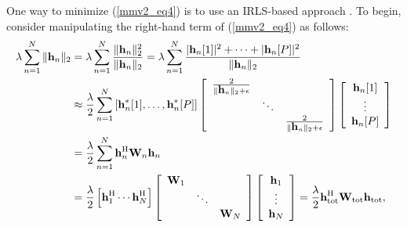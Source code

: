 \documentclass[final]{siamltex}
\newcommand{\la}[1]{\mbox{$\mathbf{#1}$}}  \newcommand{\sst}[1]{\mbox{\scriptsize{#1}}}
\begin{document}
    One way to minimize (\ref{mmv2_eq4}) is to use an IRLS-based
    approach \cite{Kar1970}.  To begin, consider manipulating the
    right-hand term of (\ref{mmv2_eq4}) as follows:
    \begin{equation}\label{irls}
      \begin{split}
        \lambda \sum_{n=1}^{N} \Vert \la{h}_n \Vert_2 &
        = \lambda \sum_{n=1}^{N} \frac{\Vert \la{h}_n \Vert_2^2}{\Vert \la{h}_n \Vert_2}
        = \lambda \sum_{n=1}^{N} \frac{|\la{h}_n[1]|^2 + \cdots + |\la{h}_n[P]|^2}{\Vert \la{h}_n \Vert_2}\\
      & \approx \frac{\lambda}{2} \sum_{n=1}^{N} \left[ \la{h}_n^{\ast}[1], \ldots, \la{h}_n^{\ast}[P]  \right]
              \left[  \begin{array}{ccc}
                 \tfrac{2}{\Vert \la{h}_n \Vert_2 + \epsilon} &        &   \\
                                                 & \ddots &   \\
                                                 &        & \tfrac{2}{\Vert \la{h}_n \Vert_2 + \epsilon} \\
                      \end{array}
              \right]
              \left[ \begin{array}{c}
                       \la{h}_n[1] \\
                       \vdots \\
                       \la{h}_n[P]
                     \end{array}
              \right] \\
         & = \frac{\lambda}{2} \sum_{n=1}^{N} \la{h}_n^{\sst{H}} \la{W}_n \la{h}_n \\
         & = \frac{\lambda}{2} \left[ \la{h}_1^{\sst{H}} \cdots \la{h}_N^{\sst{H}} \right]
                         \left[ \begin{array}{ccc}
                                \la{W}_1 &         &           \\
                                         & \ddots  &           \\
                                         &         & \la{W}_N  \\
                                \end{array} \right]
                 \left [ \begin{array}{c}
                             \la{h}_1 \\
                             \vdots  \\
                              \la{h}_N \\
                              \end{array}
           \right ] = \frac{\lambda}{2} \la{h}_{\sst{tot}}^{\sst{H}} \la{W}_{\sst{tot}} \la{h}_{\sst{tot}},
      \end{split}
    \end{equation}
\end{document}
